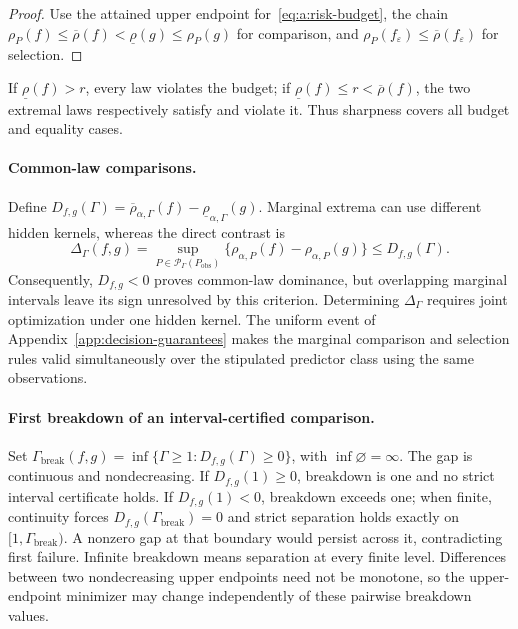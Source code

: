 \begin{proof}
Use the attained upper endpoint for~\eqref{eq:a:risk-budget}, the chain $\rho_P(f)\leq\overline\rho(f)<\underline\rho(g)\leq\rho_P(g)$ for comparison, and $\rho_P(f_\varepsilon)\leq\overline\rho(f_\varepsilon)$ for selection.
\end{proof}
If $\underline\rho(f)>r$, every law violates the budget; if $\underline\rho(f)\leq r<\overline\rho(f)$, the two extremal laws respectively satisfy and violate it. Thus sharpness covers all budget and equality cases.

\paragraph{Common-law comparisons.}
Define $D_{f,g}(\Gamma)=\overline\rho_{\alpha,\Gamma}(f)-\underline\rho_{\alpha,\Gamma}(g)$. Marginal extrema can use different hidden kernels, whereas the direct contrast is
\begin{equation}
\Delta_\Gamma(f,g)=\sup_{P\in\mathcal P_\Gamma(P_{\mathrm{obs}})}
\{\rho_{\alpha,P}(f)-\rho_{\alpha,P}(g)\}\leq D_{f,g}(\Gamma).
\label{eq:e:common-law-comparison}
\end{equation}
Consequently, $D_{f,g}<0$ proves common-law dominance, but overlapping marginal intervals leave its sign unresolved by this criterion. Determining $\Delta_\Gamma$ requires joint optimization under one hidden kernel. The uniform event of Appendix~\ref{app:decision-guarantees} makes the marginal comparison and selection rules valid simultaneously over the stipulated predictor class using the same observations.

\paragraph{First breakdown of an interval-certified comparison.}
Set $\Gamma_{\mathrm{break}}(f,g)=\inf\{\Gamma\geq1:D_{f,g}(\Gamma)\geq0\}$, with $\inf\varnothing=\infty$. The gap is continuous and nondecreasing. If $D_{f,g}(1)\geq0$, breakdown is one and no strict interval certificate holds. If $D_{f,g}(1)<0$, breakdown exceeds one; when finite, continuity forces $D_{f,g}(\Gamma_{\mathrm{break}})=0$ and strict separation holds exactly on $[1,\Gamma_{\mathrm{break}})$. A nonzero gap at that boundary would persist across it, contradicting first failure. Infinite breakdown means separation at every finite level. Differences between two nondecreasing upper endpoints need not be monotone, so the upper-endpoint minimizer may change independently of these pairwise breakdown values.
